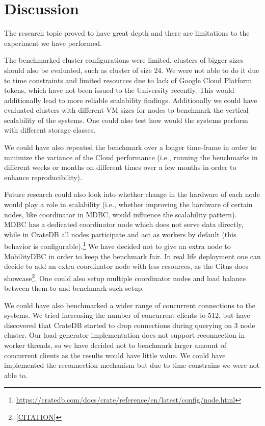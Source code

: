 \section{Discussion}
\label{cha:discussion}

The research topic proved to have great depth and there are limitations to the experiment we have performed.

The benchmarked cluster configurations were limited, clusters of bigger sizes should also be evaluated, such as cluster of size 24.
We were not able to do it due to time constraints and limited resources due to lack of Google Cloud Platform tokens, which have not been issued to the University recently.
This would additionally lead to more reliable scalability findings.
Additionally we could have evaluated clusters with different VM sizes for nodes to benchmark the vertical scalability of the systems.
One could also test how would the systems perform with different storage classes.

We could have also repeated the benchmark over a longer time-frame in order to minimize the variance of the Cloud performance
(i.e., running the benchmarks in different weeks or months on different times over a few months in order to enhance reproducibility).

Future research could also look into whether change in the hardware of each node would play a role in scalability 
(i.e., whether improving the hardware of certain nodes, like coordinator in MDBC, would influence the scalability pattern).
MDBC has a dedicated coordinator node which does not serve data directly, while in CrateDB all nodes participate and act as workers by default (this behavior is configurable).\footnote{\url{https://cratedb.com/docs/crate/reference/en/latest/config/node.html}}
We have decided not to give an extra node to MobilityDBC in order to keep the benchmark fair.
In real life deployment one can decide to add an extra coordinator node with less resources, as the Citus docs showcase\footnote{\url{[CITATION]}}.
One could also setup multiple coordinator nodes and load balance between them to and benchmark such setup.

We could have also benchmarked a wider range of concurrent connections to the systems.
We tried increasing the number of concurrent clients to 512, but have discovered that CrateDB started to drop connections during querying on 3 node cluster.
Our load-generator implementation does not support reconnection in worker threads, so we have decided not to benchmark larger amount of concurrent clients as the results would have little value.
We could have implemented the reconnection mechanism but due to time constrains we were not able to.


